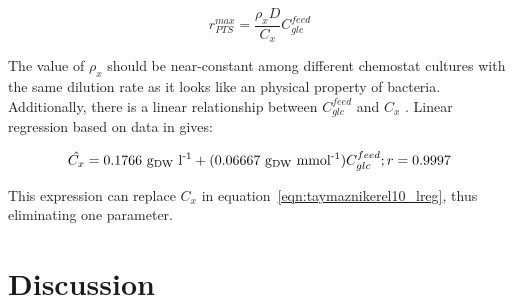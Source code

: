 \documentclass[parskip=full, numbers=noenddot]{scrreprt}
\begin{document}
\begin{equation}
    r_{PTS}^{max} = \frac{\rho_{x}D}{C_{x}}C_{glc}^{feed}
  \end{equation}
  \label{eqn:lundmediumequation}

  The value of $\rho_{x}$ should be near-constant among different chemostat cultures with the same dilution rate as it looks like an physical property of bacteria.
  Additionally, there is a linear relationship between $C_{glc}^{feed}$ and $C_{x}$ \citep{schulze_relationship_1964}.  Linear regression based on data in \citet{taymaz-nikerel_genome-derived_2010} gives:

\begin{equation}
    \hat{C_{x}} = 0.1766 \textrm{ g\textsubscript{DW} l\textsuperscript{-1}} + (0.06667 \textrm{ g\textsubscript{DW} mmol\textsuperscript{-1}})C_{glc}^{feed}; r = 0.9997
  \end{equation}
  \label{eqn:taymaznikerel10_lreg}

This expression can replace $C_{x}$ in equation~\vref{eqn:taymaznikerel10_lreg}, thus eliminating one parameter.

\chapter{Discussion}
\label{ch:discussion}



\end{document}

